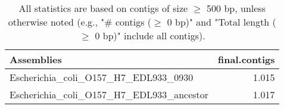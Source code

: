 \documentclass[12pt,a4paper]{article}
\begin{document}
\begin{table}[ht]
\begin{center}
\caption{All statistics are based on contigs of size $\geq$ 500 bp, unless otherwise noted (e.g., "\# contigs ($\geq$ 0 bp)" and "Total length ($\geq$ 0 bp)" include all contigs).}
\begin{tabular}{|l*{1}{|r}|}
\hline
Assemblies & final.contigs \\ \hline
Escherichia\_coli\_O157\_H7\_EDL933\_0930 & 1.015 \\ \hline
Escherichia\_coli\_O157\_H7\_EDL933\_ancestor & 1.017 \\ \hline
\end{tabular}
\end{center}
\end{table}
\end{document}

